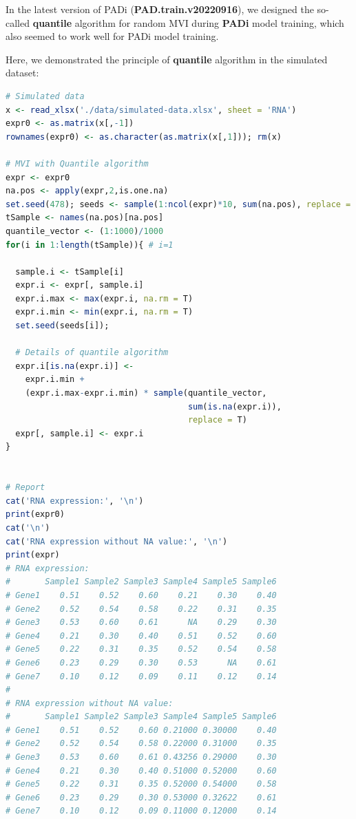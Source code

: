 \documentclass[
  12pt,
]{book}
\begin{document}
In the latest version of PADi (\textbf{PAD.train.v20220916}), we designed the so-called \textbf{quantile} algorithm for random MVI during \textbf{PADi} model training, which also seemed to work well for PADi model training.

Here, we demonstrated the principle of \textbf{quantile} algorithm in the simulated dataset:

\begin{lstlisting}[language=R]
# Simulated data
x <- read_xlsx('./data/simulated-data.xlsx', sheet = 'RNA')
expr0 <- as.matrix(x[,-1])
rownames(expr0) <- as.character(as.matrix(x[,1])); rm(x)

# MVI with Quantile algorithm
expr <- expr0
na.pos <- apply(expr,2,is.one.na)
set.seed(478); seeds <- sample(1:ncol(expr)*10, sum(na.pos), replace = F)
tSample <- names(na.pos)[na.pos]
quantile_vector <- (1:1000)/1000
for(i in 1:length(tSample)){ # i=1
  
  sample.i <- tSample[i]
  expr.i <- expr[, sample.i]
  expr.i.max <- max(expr.i, na.rm = T)
  expr.i.min <- min(expr.i, na.rm = T)
  set.seed(seeds[i]);
  
  # Details of quantile algorithm
  expr.i[is.na(expr.i)] <-
    expr.i.min +
    (expr.i.max-expr.i.min) * sample(quantile_vector,
                                     sum(is.na(expr.i)),
                                     replace = T)
  expr[, sample.i] <- expr.i
}
  

# Report
cat('RNA expression:', '\n')
print(expr0)
cat('\n')
cat('RNA expression without NA value:', '\n')
print(expr)
# RNA expression: 
#       Sample1 Sample2 Sample3 Sample4 Sample5 Sample6
# Gene1    0.51    0.52    0.60    0.21    0.30    0.40
# Gene2    0.52    0.54    0.58    0.22    0.31    0.35
# Gene3    0.53    0.60    0.61      NA    0.29    0.30
# Gene4    0.21    0.30    0.40    0.51    0.52    0.60
# Gene5    0.22    0.31    0.35    0.52    0.54    0.58
# Gene6    0.23    0.29    0.30    0.53      NA    0.61
# Gene7    0.10    0.12    0.09    0.11    0.12    0.14
# 
# RNA expression without NA value: 
#       Sample1 Sample2 Sample3 Sample4 Sample5 Sample6
# Gene1    0.51    0.52    0.60 0.21000 0.30000    0.40
# Gene2    0.52    0.54    0.58 0.22000 0.31000    0.35
# Gene3    0.53    0.60    0.61 0.43256 0.29000    0.30
# Gene4    0.21    0.30    0.40 0.51000 0.52000    0.60
# Gene5    0.22    0.31    0.35 0.52000 0.54000    0.58
# Gene6    0.23    0.29    0.30 0.53000 0.32622    0.61
# Gene7    0.10    0.12    0.09 0.11000 0.12000    0.14
\end{lstlisting}
\end{document}
